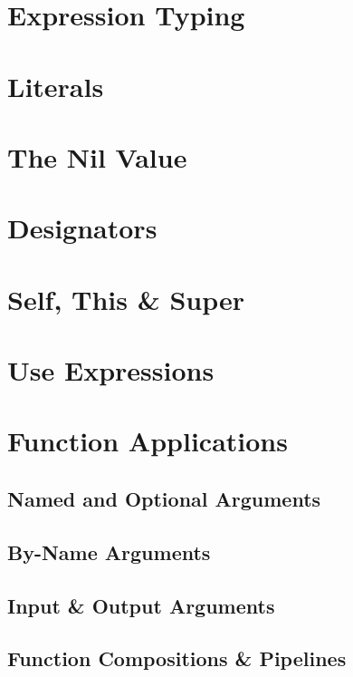 \section{Expression Typing}

\section{Literals}

\section{The Nil Value}

\section{Designators}

\section{Self, This \& Super}
\label{sec:self-this-super}

\section{Use Expressions}
\label{sec:use-expressions}

\section{Function Applications}
\label{sec:function-applications}

\subsection{Named and Optional Arguments}
\label{sec:named-optional-arguments}

\subsection{By-Name Arguments}
\label{sec:by-name-arguments}

\subsection{Input \& Output Arguments}
\label{sec:io-arguments}

\subsection{Function Compositions \& Pipelines}

